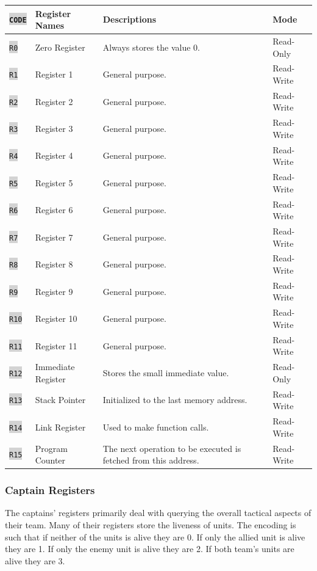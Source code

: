 \documentclass{article}
\newcommand{\vnscode}[1]{\colorbox{lightgray}{\lstinline[language=vns]{#1}}}
\begin{document}
\begin{minipage}{\textwidth}
\centering
\begin{tabular}{llll}
    \hline \vnscode{CODE} & Register Names & Descriptions & Mode \\ \hline
    \vnscode{R0} & Zero Register & Always stores the value 0. & Read-Only \\
    \vnscode{R1} & Register 1 & General purpose. & Read-Write \\
    \vnscode{R2} & Register 2 & General purpose. & Read-Write \\
    \vnscode{R3} & Register 3 & General purpose. & Read-Write \\
    \vnscode{R4} & Register 4 & General purpose. & Read-Write \\
    \vnscode{R5} & Register 5 & General purpose. & Read-Write \\
    \vnscode{R6} & Register 6 & General purpose. & Read-Write \\
    \vnscode{R7} & Register 7 & General purpose. & Read-Write \\
    \vnscode{R8} & Register 8 & General purpose. & Read-Write \\
    \vnscode{R9} & Register 9 & General purpose. & Read-Write \\
    \vnscode{R10} & Register 10 & General purpose. & Read-Write \\
    \vnscode{R11} & Register 11 & General purpose. & Read-Write \\
    \vnscode{R12} & Immediate Register & Stores the small immediate value. & Read-Only \\
    \vnscode{R13} & Stack Pointer & Initialized to the last memory address. & Read-Write \\
    \vnscode{R14} & Link Register & Used to make function calls. & Read-Write \\
    \vnscode{R15} & Program Counter & The next operation to be executed is fetched from this address. & Read-Write \\
\end{tabular}
\end{minipage}

\subsubsection{Captain Registers}

The captains' registers primarily deal with querying the overall tactical
aspects of their team. Many of their registers store the liveness of units. The
encoding is such that if neither of the units is alive they are 0. If only the
allied unit is alive they are 1. If only the enemy unit is alive they are 2. If
both team's units are alive they are 3.
\end{document}

